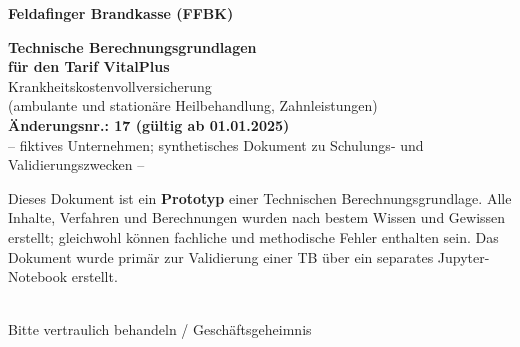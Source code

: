\begin{titlepage}
    \centering
    \vspace*{4cm}

    {\Large \textbf{Feldafinger Brandkasse (FFBK)}}

    \vspace{1.5cm}

    {\LARGE \textbf{Technische Berechnungsgrundlagen}}\\[0.6cm]
    {\LARGE \textbf{für den Tarif VitalPlus}}\\[1.2cm]
    {\Large Krankheitskostenvollversicherung}\\[0.3cm]
    {\Large (ambulante und stationäre Heilbehandlung, Zahnleistungen)}\\[1.2cm]
    {\Large \textbf{Änderungsnr.: 17 (gültig ab 01.01.2025)}}\\[2.5cm]

    {\normalsize -- fiktives Unternehmen; synthetisches Dokument zu Schulungs- und Validierungszwecken --}\\[0.6cm]

    \begin{minipage}{0.82\textwidth}\centering\small
    Dieses Dokument ist ein \textbf{Prototyp} einer Technischen
    Berechnungsgrundlage. Alle Inhalte, Verfahren und Berechnungen wurden
    nach bestem Wissen und Gewissen erstellt; gleichwohl können fachliche
    und methodische Fehler enthalten sein. Das Dokument wurde primär zur
    Validierung einer TB über ein separates Jupyter-Notebook erstellt.
    \end{minipage}\\[0.9cm]

    {\normalsize Bitte vertraulich behandeln / Geschäftsgeheimnis}

    \vfill
\end{titlepage}
